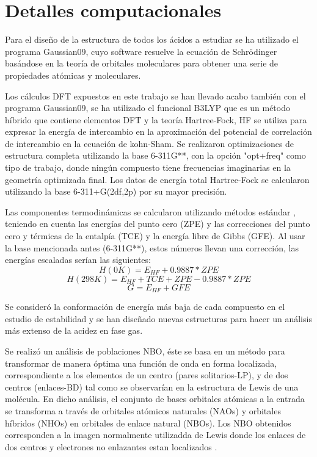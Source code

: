 \chapter{Detalles computacionales}

Para el diseño de la estructura de todos los ácidos a estudiar se ha utilizado el programa Gaussian09, cuyo software resuelve la ecuación de Schrödinger basándose en la teoría de orbitales moleculares para obtener una serie de propiedades atómicas y moleculares.

Los cálculos DFT expuestos en este trabajo se han llevado acabo también con el programa Gaussian09, se ha utilizado el funcional B3LYP que es un método híbrido que contiene elementos DFT y la teoría Hartree-Fock, HF se utiliza para expresar la energía de intercambio en la aproximación del potencial de correlación de intercambio en la ecuación de kohn-Sham. Se realizaron optimizaciones de estructura completa utilizando la base 6-311G**, con la opción "opt+freq" como tipo de trabajo, donde ningún compuesto tiene frecuencias imaginarias en la geometría optimizada final. Los datos de energía total Hartree-Fock se calcularon utilizando la base 6-311+G(2df,2p) por su mayor precisión.


Las componentes termodinámicas se calcularon utilizando métodos estándar \cite {quimica4}, teniendo en cuenta las energías del punto cero (ZPE) y las correcciones del punto cero y térmicas de la entalpía (TCE) y la energía libre de Gibbs (GFE). Al usar la base mencionada antes (6-311G**), estos números llevan una corrección, las energías escaladas serían las siguientes: \\
$$ H (0K) = E_{HF} + 0.9887*ZPE $$ 
$$ H (298K) = E_{HF} + TCE + ZPE - 0.9887*ZPE $$ 
$$G = E_{HF} + GFE $$

Se consideró la conformación de energía más baja de cada compuesto en el estudio de estabilidad y se han diseñado nuevas estructuras para hacer un análisis más extenso de la acidez en fase gas.

Se realizó un análisis de poblaciones NBO, éste se basa en un método para transformar de manera óptima una función de onda en forma localizada, correspondiente a los elementos de un centro (pares solitarios-LP), y de dos centros (enlaces-BD) tal como se observarían en la estructura de Lewis de una molécula. En dicho análisis, el conjunto de bases orbitales atómicas a la entrada se transforma a través de orbitales atómicos naturales (NAOs) y orbitales híbridos (NHOs) en orbitales de enlace natural (NBOs). Los NBO obtenidos corresponden a la imagen normalmente utilizadda de Lewis donde los enlaces de dos centros y electrones no enlazantes estan localizados \cite{quimica5}.

